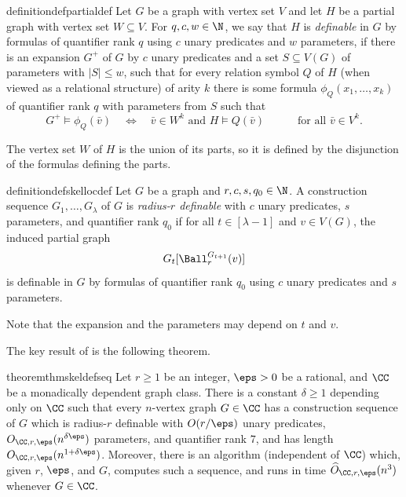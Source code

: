 \begin{restatable}{definition}{defpartialdef}\label{def:partial-definable}
Let $G$ be a graph with vertex set $V$ and let $H$ be a partial graph with vertex set $W\subseteq V$.
For $q,c,w\in \N$,
we say that $H$ is \emph{definable} in $G$  by formulas of quantifier rank $q$ using $c$ unary predicates and $w$ parameters, if
there is an expansion $G^+$ of $G$ by $c$ unary predicates
and a set $S\subseteq V(G)$ of parameters with $|S|\le w$,
such that for every relation symbol $Q$ of $H$ (when viewed as a relational structure) of arity $k$ there is some formula $\phi_Q(x_1,\ldots,x_k)$ of quantifier rank $q$ with parameters from $S$
such that
$$G^+\models\phi_Q(\bar v)\quad\iff\quad \bar v\in W^k\text{ and }H\models Q(\bar v)\qquad\quad\text{for all $\bar v\in V^k$.}$$
\end{restatable}

The vertex set $W$ of $H$ is the union of its parts, so it is defined by the disjunction of the formulas defining the parts.

\begin{restatable}{definition}{defskellocdef}\label{def:skel-loc-def}
  Let $G$ be a graph and $r,c,s,q_0\in\N$.
  A construction sequence $G_1,\ldots,G_\lambda$ of $G$ is \emph{radius-$r$ definable} with $c$ unary predicates, $s$ parameters, and quantifier rank $q_0$
  if for all $t\in[\lambda-1]$ and $v\in V(G)$, the induced partial graph
  \[
      G_t[\Ball^{G_{t+1}}_r(v)]
  \]
  is definable in $G$ by formulas of quantifier rank $q_0$ using $c$ unary predicates and $s$ parameters.
\end{restatable}

\noindent Note that the expansion and the parameters may depend on $t$ and $v$.

\medskip

The key result of  is the following theorem.
\begin{restatable}{theorem}{thmskeldefseq}\label{thm:skel-def-seq}
  Let $r\ge 1$ be an integer, $\eps>0$ be a rational, and $\CC$ be a monadically dependent graph class. There is a constant $\delta\ge1$ depending only on $\CC$ such that every $n$-vertex graph $G\in\CC$
  has a construction sequence of $G$ which is radius-$r$ definable with $O(r/\eps)$ unary predicates, $O_{\CC,r,\eps}(n^{\delta\eps})$ parameters, and quantifier rank $7$, and has length $O_{\CC,r,\eps}(n^{1+\delta\eps})$. Moreover, there is an algorithm (independent of $\CC$)
  which, given $r$, $\eps$, and $G$, computes such a sequence, and runs in time $\widehat O_{\CC,r,\eps}(n^3)$ whenever $G\in\CC$.
\end{restatable}

